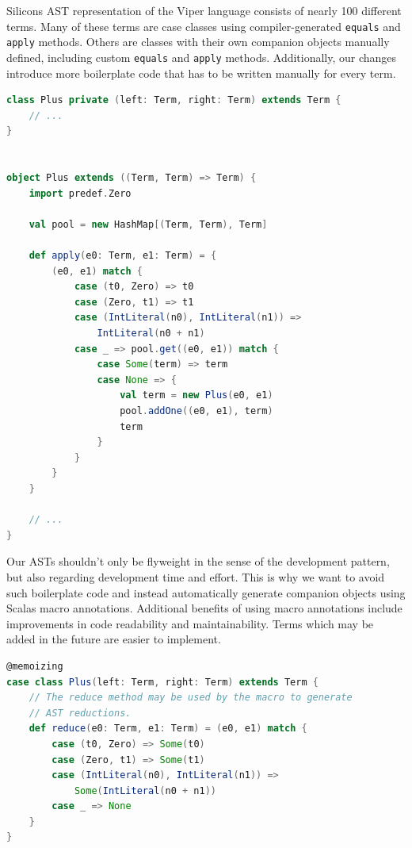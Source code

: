 \documentclass[11pt]{article}
\begin{document}
    Silicons AST representation of the Viper language consists of nearly 100 different terms.
    Many of these terms are case classes using compiler-generated \texttt{equals} and \texttt{apply} methods.
    Others are classes with their own companion objects manually defined,
    including custom \texttt{equals} and \texttt{apply} methods.
    Additionally, our changes introduce more boilerplate code that has to be written manually
    for every term.

    \begin{lstlisting}[language=Scala, caption=The \texttt{apply} method of the \texttt{Plus} class additionally defines AST reductions. Together with our planned changes the amount boilerplate code will increase significantly.]
class Plus private (left: Term, right: Term) extends Term {
    // ...
}
        

object Plus extends ((Term, Term) => Term) {
    import predef.Zero

    val pool = new HashMap[(Term, Term), Term]

    def apply(e0: Term, e1: Term) = {
        (e0, e1) match {
            case (t0, Zero) => t0
            case (Zero, t1) => t1
            case (IntLiteral(n0), IntLiteral(n1)) =>
                IntLiteral(n0 + n1)
            case _ => pool.get((e0, e1)) match {
                case Some(term) => term
                case None => {
                    val term = new Plus(e0, e1)
                    pool.addOne((e0, e1), term)
                    term
                }
            }
        }
    }

    // ...
}
    \end{lstlisting}

    Our ASTs shouldn't only be flyweight in the sense of the development pattern, but also
    regarding development time and effort. This is why we want to avoid such boilerplate
    code and instead automatically generate companion objects using Scalas macro annotations.
    Additional benefits of using macro annotations include improvements in code
    readability and maintainability. Terms which may be added in the future are easier
    to implement.

    \begin{lstlisting}[language=Scala, caption=One possible way to use macro annotations to automatically generate code in listing 4.]
@memoizing
case class Plus(left: Term, right: Term) extends Term {
    // The reduce method may be used by the macro to generate
    // AST reductions.
    def reduce(e0: Term, e1: Term) = (e0, e1) match {
        case (t0, Zero) => Some(t0)
        case (Zero, t1) => Some(t1)
        case (IntLiteral(n0), IntLiteral(n1)) =>
            Some(IntLiteral(n0 + n1))
        case _ => None
    }
}
        \end{lstlisting}
\end{document}
